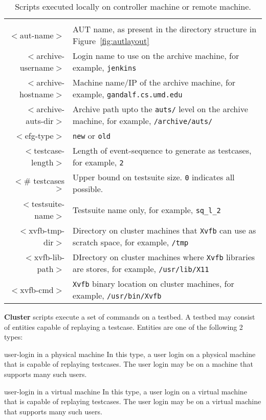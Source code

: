 \begin{table*}
{   \begin{tabular}{rl}
   & \\
   $<$aut-name$>$            & AUT name, as present in the directory structure in Figure~\ref{fig:autlayout} \\
   $<$archive-username$>$    & Login name to use on the archive machine, for example, \texttt{jenkins} \\
   $<$archive-hostname$>$    & Machine name/IP of the archive machine, for example, \texttt{gandalf.cs.umd.edu} \\
   $<$archive-auts-dir$>$    & Archive path upto the \texttt{auts/} level on the archive machine, for example, \texttt{/archive/auts/} \\
   $<$efg-type$>$            & \texttt{new} or \texttt{old} \\
   $<$testcase-length$>$     & Length of event-sequence to generate as testcases, for example, \texttt{2} \\
   $<$\# testcases$>$         & Upper bound on testsuite size. \texttt{0} indicates all possible. \\
   $<$testsuite-name$>$      & Testsuite name only, for example, \texttt{sq\_l\_2} \\
   $<$xvfb-tmp-dir$>$        & Directory on cluster machines that \texttt{Xvfb} can use as scratch space, for example, \texttt{/tmp} \\
   $<$xvfb-lib-path$>$       & DIrectory on cluster machines where \texttt{Xvfb} libraries are stores, for example, \texttt{/usr/lib/X11} \\
   $<$xvfb-cmd$>$            & \texttt{Xvfb} binary location on cluster machines, for example, \texttt{/usr/bin/Xvfb}
   \end{tabular}

   }

   \caption{Scripts executed locally on controller machine or remote machine.}
   \label{table:localscripts}
\end{table*}

\noindent \textbf{Cluster} scripts execute a set of commands on a testbed. A testbed may consist of entities capable of replaying a testcase. Entities are one of the following 2 types:\\

\begin{smalldescription}
\item [user-login in a physical machine] In this type, a user login on a physical machine that is capable of replaying testcases. The user login may be on a machine that supports many such users.
\item [user-login in a virtual machine] In this type, a user login on a virtual machine that is capable of replaying testcases. The user login may be on a virtual machine that supports many such users.\\
\end{smalldescription}

